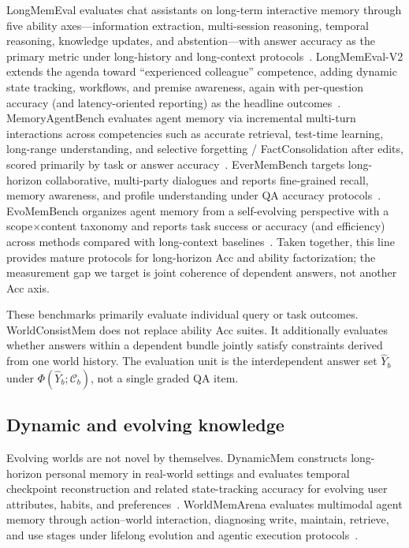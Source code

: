 LongMemEval evaluates chat assistants on long-term interactive memory through five ability axes---information extraction, multi-session reasoning, temporal reasoning, knowledge updates, and abstention---with answer accuracy as the primary metric under long-history and long-context protocols~\citep{wu2025longMemEval}. LongMemEval-V2 extends the agenda toward ``experienced colleague'' competence, adding dynamic state tracking, workflows, and premise awareness, again with per-question accuracy (and latency-oriented reporting) as the headline outcomes~\citep{wu2026longMemEvalV2}. MemoryAgentBench evaluates agent memory via incremental multi-turn interactions across competencies such as accurate retrieval, test-time learning, long-range understanding, and selective forgetting / FactConsolidation after edits, scored primarily by task or answer accuracy~\citep{hu2025memoryAgentBench}. EverMemBench targets long-horizon collaborative, multi-party dialogues and reports fine-grained recall, memory awareness, and profile understanding under QA accuracy protocols~\citep{hu2026everMemBench}. EvoMemBench organizes agent memory from a self-evolving perspective with a scope$\times$content taxonomy and reports task success or accuracy (and efficiency) across methods compared with long-context baselines~\citep{wang2026evoMemBench}. Taken together, this line provides mature protocols for long-horizon Acc and ability factorization; the measurement gap we target is joint coherence of dependent answers, not another Acc axis.

These benchmarks primarily evaluate individual query or task outcomes. WorldConsistMem does not replace ability Acc suites. It additionally evaluates whether answers within a dependent bundle jointly satisfy constraints derived from one world history. The evaluation unit is the interdependent answer set $\hat Y_b$ under $\Phi(\hat Y_b;\mathcal{C}_b)$, not a single graded QA item.

\subsection{Dynamic and evolving knowledge}

Evolving worlds are not novel by themselves. DynamicMem constructs long-horizon personal memory in real-world settings and evaluates temporal checkpoint reconstruction and related state-tracking accuracy for evolving user attributes, habits, and preferences~\citep{xie2026dynamicMem}. WorldMemArena evaluates multimodal agent memory through action--world interaction, diagnosing write, maintain, retrieve, and use stages under lifelong evolution and agentic execution protocols~\citep{liu2026worldMemArena}.

